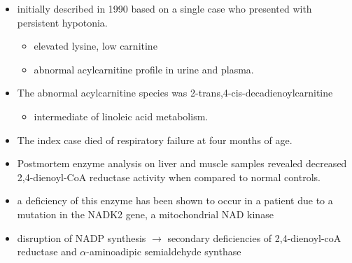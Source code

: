 \documentclass{scrartcl}
\begin{document}
\begin{enumerate}
\begin{itemize}
\item initially described in 1990 based on a single case who presented with persistent hypotonia.
\begin{itemize}
\item elevated lysine, low carnitine
\item abnormal acylcarnitine profile in urine and plasma.
\end{itemize}
\item The abnormal acylcarnitine species was 2-trans,4-cis-decadienoylcarnitine
\begin{itemize}
\item intermediate of linoleic acid metabolism.
\end{itemize}
\item The index case died of respiratory failure at four months of age.
\item Postmortem enzyme analysis on liver and muscle samples revealed
decreased 2,4-dienoyl-CoA reductase activity when compared to normal
controls.
\item a deficiency of this enzyme has been shown to occur
in a patient due to a mutation in the NADK2 gene, a mitochondrial
NAD kinase
\item disruption of NADP synthesis \(\to\) secondary deficiencies of
2,4-dienoyl-coA reductase and \(\alpha\)-aminoadipic semialdehyde
synthase
\end{itemize}
\end{enumerate}
\end{document}
